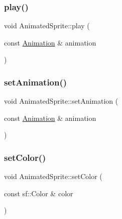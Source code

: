 \hypertarget{class_animated_sprite_a9ea345649a4e012d096bc04aafe1ecb0}{}\label{class_animated_sprite_a9ea345649a4e012d096bc04aafe1ecb0} 
\subsubsection{\texorpdfstring{play()}{play()}\hspace{0.1cm}{\footnotesize\ttfamily [2/2]}}
{\footnotesize\ttfamily void Animated\+Sprite\+::play (\begin{DoxyParamCaption}\item[{const \hyperlink{class_animation}{Animation} \&}]{animation }\end{DoxyParamCaption})}

\hypertarget{class_animated_sprite_ab1afc57d90d57a0c4bc4f5b090f2dacf}{}\label{class_animated_sprite_ab1afc57d90d57a0c4bc4f5b090f2dacf} 
\subsubsection{\texorpdfstring{set\+Animation()}{setAnimation()}}
{\footnotesize\ttfamily void Animated\+Sprite\+::set\+Animation (\begin{DoxyParamCaption}\item[{const \hyperlink{class_animation}{Animation} \&}]{animation }\end{DoxyParamCaption})}

\hypertarget{class_animated_sprite_a1a96a0f6570efddd2eb26f89bc5b6f50}{}\label{class_animated_sprite_a1a96a0f6570efddd2eb26f89bc5b6f50} 
\subsubsection{\texorpdfstring{set\+Color()}{setColor()}}
{\footnotesize\ttfamily void Animated\+Sprite\+::set\+Color (\begin{DoxyParamCaption}\item[{const sf\+::\+Color \&}]{color }\end{DoxyParamCaption})}

\hypertarget{class_animated_sprite_a0b3e38fffdc1d29f46fa08df9ef2a747}{}\label{class_animated_sprite_a0b3e38fffdc1d29f46fa08df9ef2a747} 
